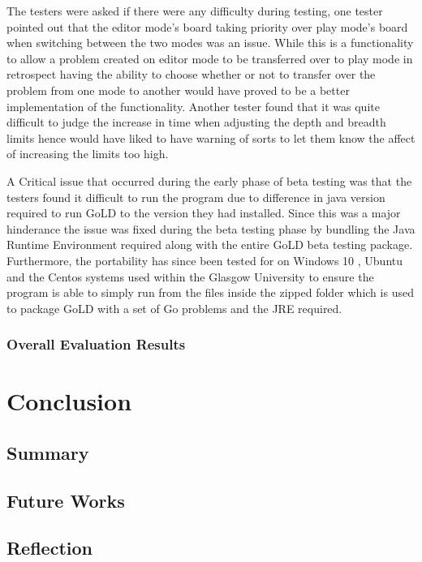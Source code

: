 \documentclass{l4proj}
\begin{document}
The testers were asked if there were any difficulty during testing, one tester pointed out that the editor mode’s board taking priority over play mode’s board when switching between the two modes was an issue. While this is a functionality to allow a problem created on editor mode to be transferred over to play mode in retrospect having the ability to choose whether or not to transfer over the problem from one mode to another would have proved to be a better implementation of the functionality. Another tester found that it was quite difficult to judge the increase in time when adjusting the depth and breadth limits hence would have liked to have warning of sorts to let them know the affect of increasing the limits too high.

A Critical issue that occurred during the early phase of beta testing was that the testers found it difficult to run the program due to difference in java version required to run GoLD to the version they had installed. Since this was a major hinderance the issue was fixed during the beta testing phase by bundling the Java Runtime Environment required along with the entire GoLD beta testing package. Furthermore, the portability has since been tested for on Windows 10 , Ubuntu and the Centos systems used within the Glasgow University to ensure the program is able to simply run from the files inside the zipped folder which is used to package GoLD with a set of Go problems and the JRE required.

\subsection{Overall Evaluation Results}




\chapter{Conclusion}

\section{Summary}

\section{Future Works}

\section{Reflection}
\end{document}
